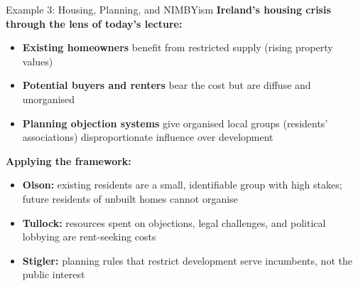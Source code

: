 \documentclass[10pt]{beamer}
\begin{document}
\begin{frame}{Example 3: Housing, Planning, and NIMBYism}
\textbf{Ireland's housing crisis through the lens of today's lecture:}

\vspace{0.1cm}
\begin{itemize}
\item \textbf{Existing homeowners} benefit from restricted supply (rising property values)
\item \textbf{Potential buyers and renters} bear the cost but are diffuse and unorganised
\item \textbf{Planning objection systems} give organised local groups (residents' associations) disproportionate influence over development
\end{itemize}

\vspace{0.1cm}
\textbf{Applying the framework:}
\begin{itemize}
\item \textbf{Olson:} existing residents are a small, identifiable group with high stakes; future residents of unbuilt homes cannot organise
\item \textbf{Tullock:} resources spent on objections, legal challenges, and political lobbying are rent-seeking costs
\item \textbf{Stigler:} planning rules that restrict development serve incumbents, not the public interest
\end{itemize}
\end{frame}
\end{document}
